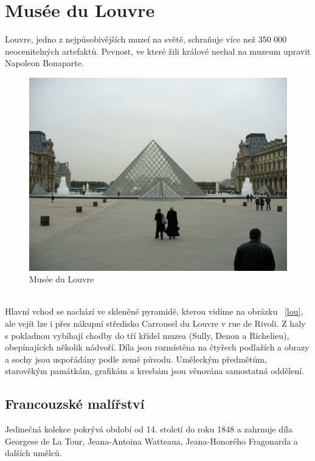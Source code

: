 \section{Musée du Louvre}
Louvre, jedno z nejpůsobivějších muzeí na světě, schraňuje více než 350 000 neocenitelných artefaktů. Pevnost, ve které žili králové nechal na muzeum upravit Napoleon Bonaparte.\\
\begin{figure}[h!]
\centering
\includegraphics[scale=0.5]{images/obr8L.jpg}
\caption{Musée du Louvre}
\label{lou}
\label{Musée du Louvre}

\end{figure}
\\Hlavní vchod se nachází ve skleněné pyramidě, kterou vidíme na obrázku ~\ref{lou}, ale vejít lze i přes nákupní středisko Carrousel du Louvre v rue de Rivoli. Z haly s pokladnou vybíhají chodby do tří křídel muzea (Sully, Denon a Richelieu), obepínajících několik nádvoří. Díla jsou rozmístěna na čtyřech podlažích a obrazy a sochy jsou uspořádány podle země původu. Uměleckým předmětům, starověkým památkám, grafikám a kresbám jsou věnována samostatná oddělení.\cite{nelson}






\subsection{Francouzské malířství}
Jedinečná kolekce pokrývá období od 14. století do roku 1848 a zahrnuje díla Georgese de La Tour, Jeana-Antoina Watteaua, Jeana-Honorého Fragonarda a dalších umělců.

